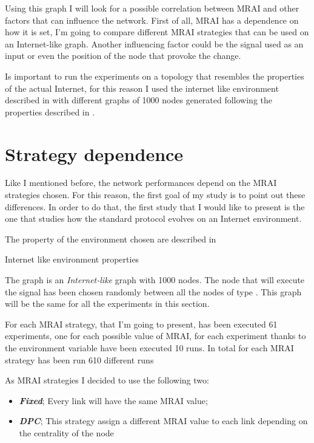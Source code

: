 Using this graph I will look for a possible correlation between \ac{MRAI} and other
factors that can influence the network.
First of all, \ac{MRAI} has a dependence on how it is set, I'm going to compare
different \ac{MRAI} strategies that can be used on an Internet-like graph.
Another influencing factor could be the signal used as an input or even the position 
of the node that provoke the change.

Is important to run the experiments on a topology that resembles the properties
of the actual Internet, for this reason I used the internet like environment
described in  with different graphs of \num{1000}
nodes generated following the properties described in \cite{elmokashfi2010scalability}.

\section{Strategy dependence}
\label{sec:bgp_mrai_strategy_dependance}

Like I mentioned before, the network performances depend on the \ac{MRAI} strategies
chosen.
For this reason, the first goal of my study is to point out these differences.
In order to do that, the first study that I would like to present is the one
that studies how the standard protocol evolves on an Internet environment.

The property of the environment chosen are described in 

\begin{table}[h]
	
	\caption{Internet like environment properties}
	\label{tbl:internet_like_properties}
\end{table}

The graph is an \textit{Internet-like} graph with \num{1000} nodes.
The node that will execute the signal has been chosen randomly between 
all the nodes of type .
This graph will be the same for all the experiments in this section.

For each \ac{MRAI} strategy, that I'm going to present, has been executed \num{61}
experiments, one for each possible value of \ac{MRAI}, for each experiment
thanks to the environment variable have been executed \num{10} runs.
In total for each \ac{MRAI} strategy has been run \num{610} different runs

As \ac{MRAI} strategies I decided to use the following two:
\begin{itemize}
	\item \textbf{\textit{Fixed}}; Every link will have the same
		\ac{MRAI} value;
	\item \textbf{\textit{DPC}}; This strategy assign a different 
		\ac{MRAI} value to each link depending on the centrality of the node \cite{milani2020improving}
\end{itemize}

